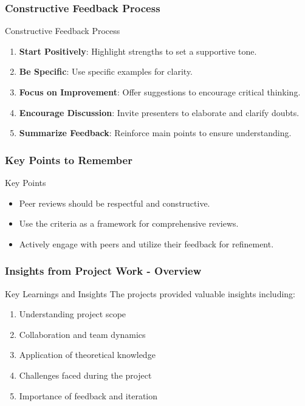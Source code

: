 \documentclass[aspectratio=169]{beamer}
\begin{document}
\begin{frame}[fragile]
  \frametitle{Constructive Feedback Process}
  \begin{block}{Constructive Feedback Process}
    \begin{enumerate}
      \item \textbf{Start Positively}: Highlight strengths to set a supportive tone.
      \item \textbf{Be Specific}: Use specific examples for clarity.
      \item \textbf{Focus on Improvement}: Offer suggestions to encourage critical thinking.
      \item \textbf{Encourage Discussion}: Invite presenters to elaborate and clarify doubts.
      \item \textbf{Summarize Feedback}: Reinforce main points to ensure understanding.
    \end{enumerate}
  \end{block}
\end{frame}

\begin{frame}[fragile]
  \frametitle{Key Points to Remember}
  \begin{block}{Key Points}
    \begin{itemize}
      \item Peer reviews should be respectful and constructive.
      \item Use the criteria as a framework for comprehensive reviews.
      \item Actively engage with peers and utilize their feedback for refinement.
    \end{itemize}
  \end{block}
\end{frame}

\begin{frame}[fragile]
    \frametitle{Insights from Project Work - Overview}
    \begin{block}{Key Learnings and Insights}
        The projects provided valuable insights including:
        \begin{enumerate}
            \item Understanding project scope
            \item Collaboration and team dynamics
            \item Application of theoretical knowledge
            \item Challenges faced during the project
            \item Importance of feedback and iteration
        \end{enumerate}
    \end{block}
\end{frame}
\end{document}
